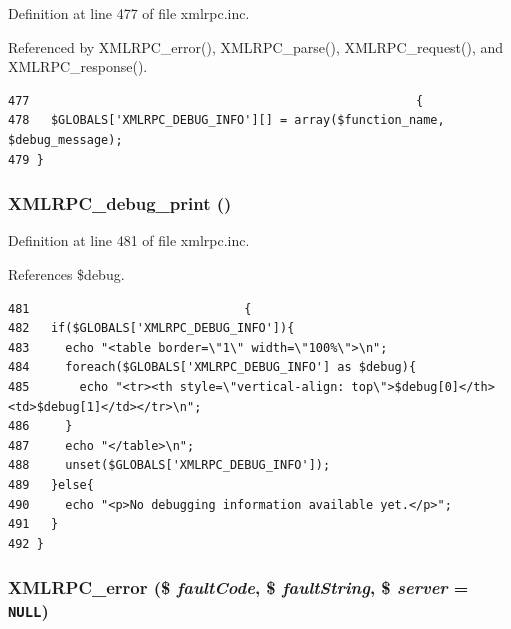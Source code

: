 Definition at line 477 of file xmlrpc.inc.

Referenced by XMLRPC\_\-error(), XMLRPC\_\-parse(), XMLRPC\_\-request(), and XMLRPC\_\-response().

\begin{Code}\begin{verbatim}477                                                      {
478   $GLOBALS['XMLRPC_DEBUG_INFO'][] = array($function_name, $debug_message);
479 }
\end{verbatim}
\end{Code}


\hypertarget{xmlrpc_8inc_8467f85edd385ddf2506b1bd5065a6d7}{
\subsubsection{\setlength{\rightskip}{0pt plus 5cm}XMLRPC\_\-debug\_\-print ()}}
\label{xmlrpc_8inc_8467f85edd385ddf2506b1bd5065a6d7}




Definition at line 481 of file xmlrpc.inc.

References \$debug.

\begin{Code}\begin{verbatim}481                              {
482   if($GLOBALS['XMLRPC_DEBUG_INFO']){
483     echo "<table border=\"1\" width=\"100%\">\n";
484     foreach($GLOBALS['XMLRPC_DEBUG_INFO'] as $debug){
485       echo "<tr><th style=\"vertical-align: top\">$debug[0]</th><td>$debug[1]</td></tr>\n";
486     }
487     echo "</table>\n";
488     unset($GLOBALS['XMLRPC_DEBUG_INFO']);
489   }else{
490     echo "<p>No debugging information available yet.</p>";
491   }
492 }
\end{verbatim}
\end{Code}


\hypertarget{xmlrpc_8inc_0cdc54b1376ccbbe412175c9819a95ac}{
\subsubsection{\setlength{\rightskip}{0pt plus 5cm}XMLRPC\_\-error (\$ {\em faultCode}, \$ {\em faultString}, \$ {\em server} = {\tt NULL})}}
\label{xmlrpc_8inc_0cdc54b1376ccbbe412175c9819a95ac}




